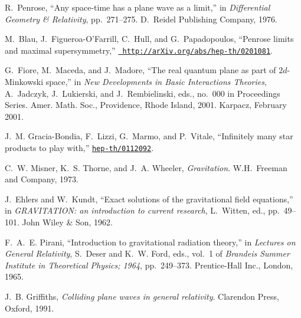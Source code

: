 \documentclass[12pt,a4paper]{article}
\newcounter{eg}
\begin{document}
\begin{thebibliography}{10}
R.~Penrose, ``Any space-time has a plane wave as a limit,'' in {\em
  Differential Geometry \& Relativity}, pp.~271--275.
\newblock D.~Reidel Publishing Company, 1976.

M.~Blau, J.~Figueroa-O'Farrill, C.~Hull, and G.~Papadopoulos, ``Penrose limits
  and maximal supersymmetry,''
\href{http://xxx.lanl.gov/abs/http://arXiv.org/abs/hep-th/0201081}{{\tt
  http://arXiv.org/abs/hep-th/0201081}}.

G.~Fiore, M.~Maceda, and J.~Madore, ``The real quantum plane as part of
  $2d$-{M}inkowski space,'' in {\em New Developments in Basic Interactions
  Theories}, A.~Jadczyk, J.~Lukierski, and J.~Rembielinski, eds., no.~000 in
  Proceedings Series.
\newblock Amer. Math. Soc., Providence, Rhode Island, 2001.
\newblock Karpacz, February 2001.

J.~M. Gracia-Bondia, F.~Lizzi, G.~Marmo, and P.~Vitale, ``Infinitely many star
  products to play with,''
\href{http://xxx.lanl.gov/abs/hep-th/0112092}{{\tt hep-th/0112092}}.

C.~W. Misner, K.~S. Thorne, and J.~A. Wheeler, {\em Gravitation}.
\newblock W.H.~Freeman and Company, 1973.

J.~Ehlers and W.~Kundt, ``Exact solutions of the gravitational field
  equations,'' in {\em {GRAVITATION}: an introduction to current research},
  L.~Witten, ed., pp.~49--101.
\newblock John Wiley \& Son, 1962.

F.~A.~E. Pirani, ``Introduction to gravitational radiation theory,'' in {\em
  Lectures on General Relativity}, S.~Deser and K.~W. Ford, eds., vol.~1 of
  {\em Brandeis Summer Institute in Theoretical Physics; 1964}, pp.~249--373.
\newblock Prentice-Hall Inc., London, 1965.

J.~B. Griffiths, {\em Colliding plane waves in general relativity}.
\newblock Clarendon Press, Oxford, 1991.

\end{thebibliography}\endgroup
\end{document}
